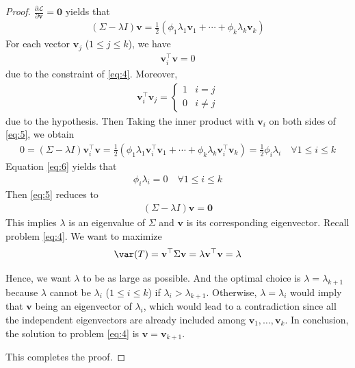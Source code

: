 \documentclass[color=blue, thmcnt=section, 12pt]{elegantbook}
\begin{document}
\begin{proof}
    \par $\frac{\partial \mathcal{L}}{\partial \mathbf{v}} = \mathbf{0}$ yields that 
    \begin{align}
        (\Sigma - \lambda I) \mathbf{v}
        = \frac{1}{2} (
            \phi_1 \lambda_1 \mathbf{v}_1
            + \cdots
            + \phi_k \lambda_k \mathbf{v}_k
        )
        \label{eq:5}
    \end{align}
    For each vector $\mathbf{v}_j$ ($1 \leq j \leq k$), we have 
    \begin{align*}
        \mathbf{v}_i^\top \mathbf{v} = 0
    \end{align*}
    due to the constraint of \eqref{eq:4}. Moreover, 
    \begin{align*}
        \mathbf{v}_i^\top \mathbf{v}_j = \begin{cases}
            1 &i = j \\ 
            0 &i \neq j
        \end{cases}
    \end{align*}
    due to the hypothesis. Then Taking the inner product with $\mathbf{v}_i$ on both sides of \eqref{eq:5}, we obtain
    \begin{align}
        0 = (\Sigma - \lambda I) \mathbf{v}_i^\top \mathbf{v}
        = \frac{1}{2} (
            \phi_1 \lambda_1 \mathbf{v}_i^\top\mathbf{v}_1
            + \cdots
            + \phi_k \lambda_k \mathbf{v}_i^\top\mathbf{v}_k
        )
        = \frac{1}{2} \phi_i \lambda_i
        \quad \forall 1 \leq i \leq k
        \label{eq:6}
    \end{align}
    Equation \eqref{eq:6} yields that
    \begin{align*}
        \phi_i \lambda_i = 0 
        \quad \forall 1 \leq i \leq k
    \end{align*}
    Then \eqref{eq:5} reduces to 
    \begin{align*}
        (\Sigma - \lambda I) \mathbf{v} = \mathbf{0}
    \end{align*}
    This implies $\lambda$ is an eigenvalue of $\Sigma$ and $\mathbf{v}$ is its corresponding eigenvector. Recall problem \eqref{eq:4}. We want to maximize 
    \begin{align*}
        \var(T) = \mathbf{v}^\top \Sigma \mathbf{v}
        = \lambda \mathbf{v}^\top \mathbf{v}
        = \lambda
    \end{align*}
    
    \par Hence, we want $\lambda$ to be as large as possible. And the optimal choice is $\lambda = \lambda_{k+1}$ because $\lambda$ cannot be $\lambda_i$ ($1 \leq i \leq k$) if $\lambda_i > \lambda_{k+1}$. Otherwise, $\lambda = \lambda_i$ would imply that $\mathbf{v}$ being an eigenvector of $\lambda_i$, which would lead to a contradiction since all the independent eigenvectors are already included among $\mathbf{v}_1, \ldots, \mathbf{v}_k$. In conclusion, the solution to problem \eqref{eq:4} is $\mathbf{v} = \mathbf{v}_{k+1}$.

    \par This completes the proof.
\end{proof}




\end{document}
